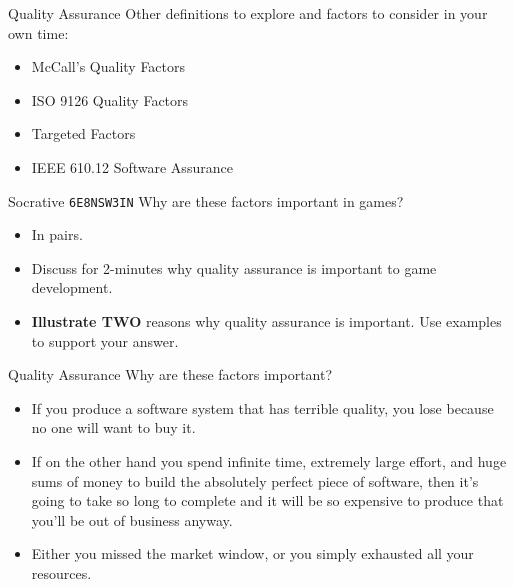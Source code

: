 \begin{frame}{Quality Assurance}
Other definitions to explore and factors to consider in your own time:

    \begin{itemize}
        \item McCall's Quality Factors
        \item ISO 9126 Quality Factors
        \item Targeted Factors
        \item IEEE 610.12 Software Assurance
    \end{itemize}
\end{frame}

\begin{frame}[fragile]{Socrative \texttt{6E8NSW3IN}}
	Why are these factors important in games?
	
	\begin{itemize}
		\item In pairs.
		\item Discuss for 2-minutes why quality assurance is important to game development.
		\item \textbf{Illustrate TWO} reasons why quality assurance is important. Use examples to support your answer. 
	\end{itemize}
\end{frame}

\begin{frame}{Quality Assurance}
Why are these factors important?

    \begin{itemize}
        \item If you produce a software system that has terrible quality, you lose because no one will want to buy it. 
        \item If on the other hand you spend infinite time, extremely large effort, and huge sums of money to build the absolutely perfect piece of software,
         then it's going to take so long to complete and it will be so expensive to produce that you'll be out of business anyway. 
        \item Either you missed the market window, or you simply exhausted all your resources. 
    \end{itemize}
\end{frame}

